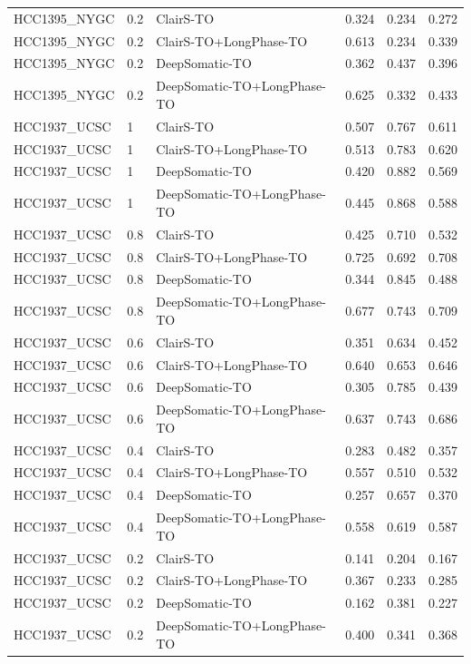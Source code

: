 \documentclass[pdflatex,sn-nature]{sn-jnl}
\begin{document}
{\begin{longtable}{@{}lllccc@{}}
  HCC1395\_NYGC & 0.2 & ClairS-TO & 0.324 & 0.234 & 0.272 \\
  HCC1395\_NYGC & 0.2 & ClairS-TO+LongPhase-TO & 0.613 & 0.234 & 0.339 \\
  HCC1395\_NYGC & 0.2 & DeepSomatic-TO & 0.362 & 0.437 & 0.396 \\
  HCC1395\_NYGC & 0.2 & DeepSomatic-TO+LongPhase-TO & 0.625 & 0.332 & 0.433 \\
  HCC1937\_UCSC & 1 & ClairS-TO & 0.507 & 0.767 & 0.611 \\
  HCC1937\_UCSC & 1 & ClairS-TO+LongPhase-TO & 0.513 & 0.783 & 0.620 \\
  HCC1937\_UCSC & 1 & DeepSomatic-TO & 0.420 & 0.882 & 0.569 \\
  HCC1937\_UCSC & 1 & DeepSomatic-TO+LongPhase-TO & 0.445 & 0.868 & 0.588 \\
  HCC1937\_UCSC & 0.8 & ClairS-TO & 0.425 & 0.710 & 0.532 \\
  HCC1937\_UCSC & 0.8 & ClairS-TO+LongPhase-TO & 0.725 & 0.692 & 0.708 \\
  HCC1937\_UCSC & 0.8 & DeepSomatic-TO & 0.344 & 0.845 & 0.488 \\
  HCC1937\_UCSC & 0.8 & DeepSomatic-TO+LongPhase-TO & 0.677 & 0.743 & 0.709 \\
  HCC1937\_UCSC & 0.6 & ClairS-TO & 0.351 & 0.634 & 0.452 \\
  HCC1937\_UCSC & 0.6 & ClairS-TO+LongPhase-TO & 0.640 & 0.653 & 0.646 \\
  HCC1937\_UCSC & 0.6 & DeepSomatic-TO & 0.305 & 0.785 & 0.439 \\
  HCC1937\_UCSC & 0.6 & DeepSomatic-TO+LongPhase-TO & 0.637 & 0.743 & 0.686 \\
  HCC1937\_UCSC & 0.4 & ClairS-TO & 0.283 & 0.482 & 0.357 \\
  HCC1937\_UCSC & 0.4 & ClairS-TO+LongPhase-TO & 0.557 & 0.510 & 0.532 \\
  HCC1937\_UCSC & 0.4 & DeepSomatic-TO & 0.257 & 0.657 & 0.370 \\
  HCC1937\_UCSC & 0.4 & DeepSomatic-TO+LongPhase-TO & 0.558 & 0.619 & 0.587 \\
  HCC1937\_UCSC & 0.2 & ClairS-TO & 0.141 & 0.204 & 0.167 \\
  HCC1937\_UCSC & 0.2 & ClairS-TO+LongPhase-TO & 0.367 & 0.233 & 0.285 \\
  HCC1937\_UCSC & 0.2 & DeepSomatic-TO & 0.162 & 0.381 & 0.227 \\
  HCC1937\_UCSC & 0.2 & DeepSomatic-TO+LongPhase-TO & 0.400 & 0.341 & 0.368 \\

\end{longtable}}
\end{document}
